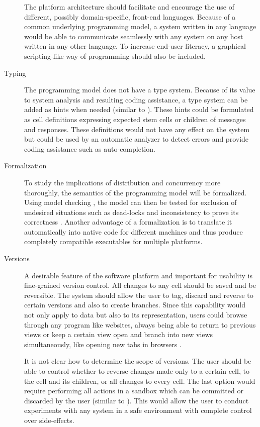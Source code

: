 \begin{description}
The platform architecture should facilitate and encourage the use of different, possibly domain-specific, front-end languages. Because of a common underlying programming model, a system written in any language would be able to communicate seamlessly with any system on any host written in any other language. To increase end-user literacy, a graphical scripting-like way of programming should also be included.

\item[Typing]

The programming model does not have a type system. Because of its value to system analysis and resulting coding assistance, a type system can be added as hints when needed (similar to \cite{PluggableTypes}). These hints could be formulated as cell definitions expressing expected stem cells or children of messages and responses. These definitions would not have any effect on the system but could be used by an automatic analyzer to detect errors and provide coding assistance such as auto-completion.

\item[Formalization]

To study the implications of distribution and concurrency more thoroughly, the semantics of the programming model will be formalized. Using model checking \cite{ModelChecking}, the model can then be tested for exclusion of undesired situations such as dead-locks and inconsistency to prove its correctness \cite{Spin}. Another advantage of a formalization is to translate it automatically into native code for different machines and thus produce completely compatible executables for multiple platforms.

\item[Versions]

A desirable feature of the software platform and important for usability is fine-grained version control. All changes to any cell should be saved and be reversible. The system should allow the user to tag, discard and reverse to certain versions and also to create branches. Since this capability would not only apply to data but also to its representation, users could browse through any program like websites, always being able to return to previous views or keep a certain view open and branch into new views simultaneously, like opening new tabs in browsers \cite{Steps2010}.

It is not clear how to determine the scope of versions. The user should be able to control whether to reverse changes made only to a certain cell, to the cell and its children, or all changes to every cell. The last option would require performing all actions in a sandbox which can be committed or discarded by the user (similar to  \cite{Worlds}). This would allow the user to conduct experiments with any system in a safe environment with complete control over side-effects.


\end{description}
